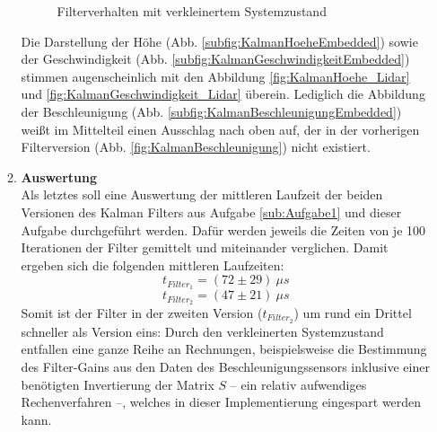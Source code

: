 \documentclass[12pt,a4paper]{article}
\begin{document}
\begin{enumerate}[label=\textbf{\arabic*})]
\begin{enumerate}[label=\textbf{\alph*})]
\begin{figure}[!ht]
		\newline
		\centering
		\caption{Filterverhalten mit verkleinertem Systemzustand}
		\label{fig:FilterAufgabe2_VerkleinertAbbildungen}
	\end{figure}
	Die Darstellung der Höhe (Abb. \ref{subfig:KalmanHoeheEmbedded}) sowie der Geschwindigkeit (Abb. \ref{subfig:KalmanGeschwindigkeitEmbedded}) stimmen augenscheinlich mit den Abbildung \ref{fig:KalmanHoehe_Lidar} und \ref{fig:KalmanGeschwindigkeit_Lidar} überein. Lediglich die Abbildung der Beschleunigung (Abb. \ref{subfig:KalmanBeschleunigungEmbedded}) weißt im Mittelteil einen Ausschlag nach oben auf, der in der vorherigen Filterversion (Abb. \ref{fig:KalmanBeschleunigung}) nicht existiert.\\
	
	\item \textbf{Auswertung}\label{subfig:AuswertungAufgabe2}\\
	
	Als letztes soll eine Auswertung der mittleren Laufzeit der beiden Versionen des Kalman Filters aus Aufgabe \ref{sub:Aufgabe1} und dieser Aufgabe durchgeführt werden. Dafür werden jeweils die Zeiten von je 100 Iterationen der Filter gemittelt und miteinander verglichen. Damit ergeben sich die folgenden mittleren Laufzeiten:
	\begin{equation}
			t_{Filter_{1}}=(72\pm 29)~\mu s
	\end{equation}
	\begin{equation}
			t_{Filter_{2}}=(47\pm 21)~\mu s
	\end{equation}
	Somit ist der Filter in der zweiten Version ($t_{Filter_{2}}$) um rund ein Drittel schneller als Version eins: Durch den verkleinerten Systemzustand entfallen eine ganze Reihe an Rechnungen, beispielsweise die Bestimmung des Filter-Gains aus den Daten des Beschleunigungssensors inklusive einer benötigten Invertierung der Matrix $S$ -- ein relativ aufwendiges Rechenverfahren --, welches in dieser Implementierung eingespart werden kann.
	\end{enumerate}
	\end{enumerate}
\end{document}
